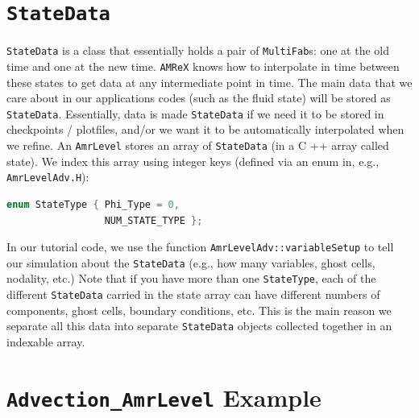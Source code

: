 \section{{\tt StateData}}
{\tt StateData} is a class that essentially holds a pair of {\tt MultiFab}s: one at the old time and one
at the new time. {\tt AMReX} knows how to interpolate in time between these states to get data at
any intermediate point in time. The main data that we care about in our applications codes 
(such as the fluid state) will be stored as {\tt StateData}. Essentially, data is made {\tt StateData}
if we need it to be stored in checkpoints / plotfiles, and/or we want it to be automatically
interpolated when we refine.
An {\tt AmrLevel} stores an array of {\tt StateData} (in a C ++ array called state). We index this array
using integer keys (defined via an enum in, e.g., {\tt AmrLevelAdv.H}):
\begin{lstlisting}[language=cpp]
enum StateType { Phi_Type = 0,
                 NUM_STATE_TYPE };
\end{lstlisting}
In our tutorial code, we use the function {\tt AmrLevelAdv::variableSetup} to tell our simulation about
the {\tt StateData} (e.g., how many variables, ghost cells, nodality, etc.)
Note that if you have more than one {\tt StateType}, each of the different {\tt StateData} 
carried in the state array can have different numbers
of components, ghost cells, boundary conditions, etc. This is the main reason we separate all this
data into separate {\tt StateData} objects collected together in an indexable array.

\section{{\tt Advection\_AmrLevel} Example}

